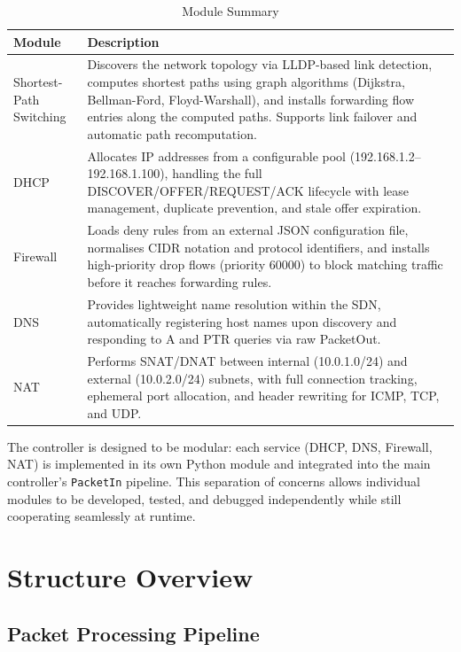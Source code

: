 \documentclass[12pt,a4paper]{article}
\begin{document}
\begin{table}[H]
\centering
\begin{tabular}{@{}lp{9cm}@{}}
\toprule
\textbf{Module} & \textbf{Description} \\
\midrule
Shortest-Path Switching & Discovers the network topology via LLDP-based link detection, computes shortest paths using graph algorithms (Dijkstra, Bellman-Ford, Floyd-Warshall), and installs forwarding flow entries along the computed paths. Supports link failover and automatic path recomputation. \\
\addlinespace
DHCP & Allocates IP addresses from a configurable pool (192.168.1.2--192.168.1.100), handling the full DISCOVER/OFFER/REQUEST/ACK lifecycle with lease management, duplicate prevention, and stale offer expiration. \\
\addlinespace
Firewall & Loads deny rules from an external JSON configuration file, normalises CIDR notation and protocol identifiers, and installs high-priority drop flows (priority 60000) to block matching traffic before it reaches forwarding rules. \\
\addlinespace
DNS & Provides lightweight name resolution within the SDN, automatically registering host names upon discovery and responding to A and PTR queries via raw PacketOut. \\
\addlinespace
NAT & Performs SNAT/DNAT between internal (10.0.1.0/24) and external (10.0.2.0/24) subnets, with full connection tracking, ephemeral port allocation, and header rewriting for ICMP, TCP, and UDP. \\
\bottomrule
\end{tabular}
\caption{Module Summary}
\end{table}

The controller is designed to be modular: each service (DHCP, DNS, Firewall, NAT) is implemented in its own Python module and integrated into the main controller's \texttt{PacketIn} pipeline. This separation of concerns allows individual modules to be developed, tested, and debugged independently while still cooperating seamlessly at runtime.

\section{Structure Overview}

\subsection{Packet Processing Pipeline}
\end{document}
